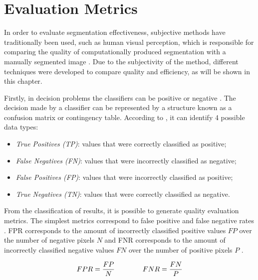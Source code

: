 \section{Evaluation Metrics}
\label{cap3_metricas_avaliacao}

In order to evaluate segmentation effectiveness, subjective methods have traditionally been used, such as human visual perception, which is responsible for comparing the quality of computationally produced segmentation with a manually segmented image \cite{Zhang08imagesegmentation}. Due to the subjectivity of the method, different techniques were developed to compare quality and efficiency, as will be shown in this chapter. 

Firstly, in decision problems the classifiers can be positive or negative \cite{DavisGoadrich:2006}. 
The decision made by a classifier can be represented by a structure known as a confusion matrix or contingency table.
According to , it can identify 4 possible data types:

\vspace{-0.2cm}
\begin{itemize}
 \item \textit{True Positives (TP)}: values that were correctly classified as positive;
 \item \textit{False Negatives (FN)}: values that were incorrectly classified as negative;
 \item \textit{False Positives (FP)}: values that were incorrectly classified as positive;
 \item \textit{True Negatives (TN)}: values that were correctly classified as negative.
\end{itemize}

From the classification of results, it is possible to generate quality evaluation metrics.
The simplest metrics correspond to false positive and false negative rates \cite{Fawcett:2006}.
\ac{FPR} corresponds to the amount of incorrectly classified positive values $FP$ over the number of negative pixels $N$ and 
\ac{FNR} corresponds to the amount of incorrectly classified negative values $FN$ over the number of positive pixels $P$ \cite{Fawcett:2006}.

\begin{equation}
  \centering
  \label{equ:cap3_false_rate}
  \begin{aligned}
    FPR = \frac{FP}{N} \qquad\qquad
    FNR = \frac{FN}{P} 
  \end{aligned}
\end{equation}

